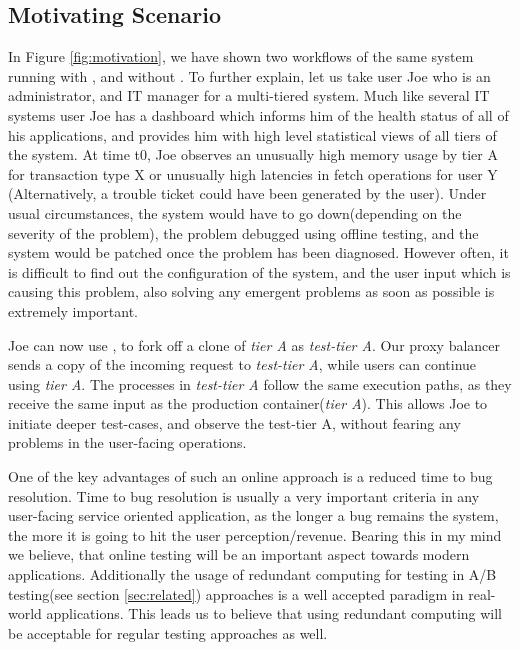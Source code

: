 


\subsection{Motivating Scenario}
\label{sec:motivation}

In Figure \ref{fig:motivation}, we have shown two workflows of the same system running with \parikshan, and without \parikshan.
To further explain, let us take  user Joe who is an administrator, and IT manager for a multi-tiered system. 
Much like several IT systems user Joe has a dashboard which informs him of the health status of all of his applications, and provides him with high level statistical views of all tiers of the system.
At time t0, Joe observes an unusually high memory usage by tier A for transaction type X or unusually high latencies in fetch operations for user Y (Alternatively, a trouble ticket could have been generated by the user).
Under usual circumstances, the system would have to go down(depending on the severity of the problem), the problem debugged using offline testing,  and the system would be patched once the problem has been diagnosed.
However often, it is difficult to find out the configuration of the system, and the user input which is causing this problem, also solving any emergent problems as soon as possible is extremely important.

Joe can now use \parikshan, to fork off a clone of \textit{tier A} as \textit{test-tier A}. 
Our proxy balancer sends a copy of the incoming request to \textit{test-tier A}, while users can continue using \textit{tier A}. 
The processes in \textit{test-tier A} follow the same execution paths, as they receive the same input as the production container(\textit{tier A}).
This allows Joe to initiate deeper test-cases, and observe the test-tier A, without fearing any problems in the user-facing operations.

One of the key advantages of such an online approach is a reduced time to bug resolution.
Time to bug resolution is usually a very important criteria in any user-facing service oriented application, as the longer a bug remains the system, the more it is going to hit the user perception/revenue.
Bearing this in my mind we believe, that online testing will be an important aspect towards modern applications.
Additionally the usage of redundant computing for testing in A/B testing(see section \ref{sec:related}) approaches is a well accepted paradigm in real-world applications.
This leads us to believe that using redundant computing will be acceptable for regular testing approaches as well.

